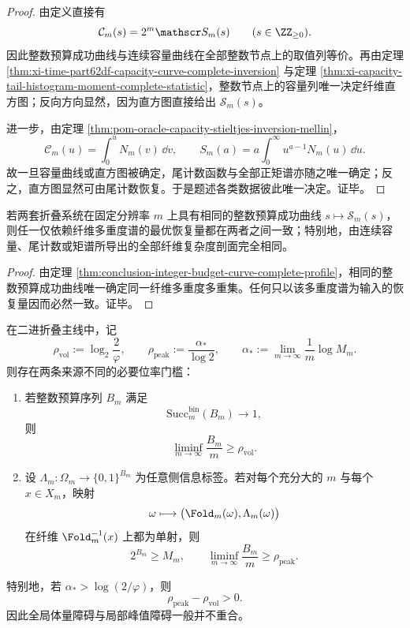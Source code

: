 \begin{proof}
由定义直接有
\[
\mathcal C_m(s)=2^m\mathscr S_m(s)
\qquad (s\in\ZZ_{\ge 0}).
\]
因此整数预算成功曲线与连续容量曲线在全部整数节点上的取值列等价。再由定理 \ref{thm:xi-time-part62df-capacity-curve-complete-inversion} 与定理 \ref{thm:xi-capacity-tail-histogram-moment-complete-statistic}，整数节点上的容量列唯一决定纤维直方图；反向方向显然，因为直方图直接给出 \(\mathscr S_m(s)\)。

进一步，由定理 \ref{thm:pom-oracle-capacity-stieltjes-inversion-mellin}，
\[
\mathcal C_m(u)=\int_0^u N_m(v)\,\dd v,
\qquad
S_m(a)=a\int_0^\infty u^{a-1}N_m(u)\,\dd u.
\]
故一旦容量曲线或直方图被确定，尾计数函数与全部正矩谱亦随之唯一确定；反之，直方图显然可由尾计数恢复。于是题述各类数据彼此唯一决定。证毕。
\end{proof}

\begin{corollary}[预算曲线的复杂度同型判据]\label{cor:conclusion-budget-curve-complexity-isomorphism}
若两套折叠系统在固定分辨率 \(m\) 上具有相同的整数预算成功曲线 \(s\mapsto \mathscr S_m(s)\)，则任一仅依赖纤维多重度谱的最优恢复量都在两者之间一致；特别地，由连续容量、尾计数或矩谱所导出的全部纤维复杂度剖面完全相同。
\end{corollary}

\begin{proof}
由定理 \ref{thm:conclusion-integer-budget-curve-complete-profile}，相同的整数预算成功曲线唯一确定同一纤维多重度多重集。任何只以该多重度谱为输入的恢复量因而必然一致。证毕。
\end{proof}

\begin{theorem}[体量阈值与峰值阈值的分离]\label{thm:conclusion-volume-peak-threshold-separation}
在二进折叠主线中，记
\[
\rho_{\mathrm{vol}}:=\log_2\frac{2}{\varphi},
\qquad
\rho_{\mathrm{peak}}:=\frac{\alpha_\ast}{\log 2},
\qquad
\alpha_\ast:=\lim_{m\to\infty}\frac1m\log M_m.
\]
则存在两条来源不同的必要位率门槛：
\begin{enumerate}
  \item 若整数预算序列 \(B_m\) 满足
  \[
  \mathrm{Succ}^{\mathrm{bin}}_m(B_m)\longrightarrow 1,
  \]
  则
  \[
  \liminf_{m\to\infty}\frac{B_m}{m}\ge \rho_{\mathrm{vol}}.
  \]
  \item 设 \(\Lambda_m:\Omega_m\to\{0,1\}^{B_m}\) 为任意侧信息标签。若对每个充分大的 \(m\) 与每个 \(x\in X_m\)，映射
  \[
  \omega\longmapsto \bigl(\Fold_m(\omega),\Lambda_m(\omega)\bigr)
  \]
  在纤维 \(\Fold_m^{-1}(x)\) 上都为单射，则
  \[
  2^{B_m}\ge M_m,
  \qquad
  \liminf_{m\to\infty}\frac{B_m}{m}\ge \rho_{\mathrm{peak}}.
  \]
\end{enumerate}
特别地，若 \(\alpha_\ast>\log(2/\varphi)\)，则
\[
\rho_{\mathrm{peak}}-\rho_{\mathrm{vol}}>0.
\]
因此全局体量障碍与局部峰值障碍一般并不重合。
\end{theorem}

